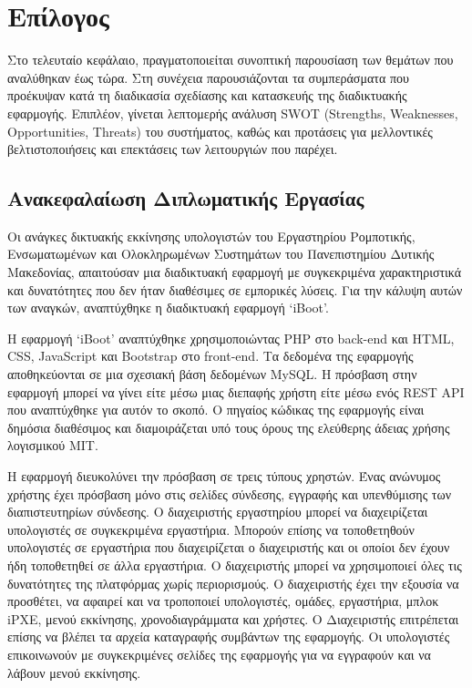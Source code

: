 \chapter{Επίλογος}
Στο τελευταίο κεφάλαιο, πραγματοποιείται συνοπτική παρουσίαση των θεμάτων που αναλύθηκαν έως τώρα. Στη συνέχεια παρουσιάζονται τα συμπεράσματα που προέκυψαν κατά τη διαδικασία σχεδίασης και κατασκευής της διαδικτυακής εφαρμογής.
Επιπλέον, γίνεται λεπτομερής ανάλυση SWOT (Strengths, Weaknesses, Opportunities, Threats) του συστήματος, καθώς και προτάσεις για μελλοντικές βελτιστοποιήσεις και επεκτάσεις των λειτουργιών που παρέχει.

\section{Ανακεφαλαίωση Διπλωματικής Εργασίας}
Οι ανάγκες δικτυακής εκκίνησης υπολογιστών του Εργαστηρίου Ρομποτικής, Ενσωματωμένων και Ολοκληρωμένων Συστημάτων του Πανεπιστημίου Δυτικής Μακεδονίας, απαιτούσαν μια διαδικτυακή εφαρμογή με συγκεκριμένα χαρακτηριστικά και δυνατότητες που δεν ήταν διαθέσιμες σε εμπορικές λύσεις. Για την κάλυψη αυτών των αναγκών, αναπτύχθηκε η διαδικτυακή εφαρμογή `iBoot'.

Η εφαρμογή `iBoot' αναπτύχθηκε χρησιμοποιώντας PHP στο back-end και HTML, CSS, JavaScript και Bootstrap στο front-end. Τα δεδομένα της εφαρμογής αποθηκεύονται σε μια σχεσιακή βάση δεδομένων MySQL. Η πρόσβαση στην εφαρμογή μπορεί να γίνει είτε μέσω μιας διεπαφής χρήστη είτε μέσω ενός REST API που αναπτύχθηκε για αυτόν το σκοπό. Ο πηγαίος κώδικας της εφαρμογής είναι δημόσια διαθέσιμος και διαμοιράζεται υπό τους όρους της ελεύθερης άδειας χρήσης λογισμικού MIT.

Η εφαρμογή διευκολύνει την πρόσβαση σε τρεις τύπους χρηστών.
Ένας ανώνυμος χρήστης έχει πρόσβαση μόνο στις σελίδες σύνδεσης, εγγραφής και υπενθύμισης των διαπιστευτηρίων σύνδεσης.
Ο διαχειριστής εργαστηρίου μπορεί να διαχειρίζεται υπολογιστές σε συγκεκριμένα εργαστήρια. Μπορούν επίσης να τοποθετηθούν υπολογιστές σε εργαστήρια που διαχειρίζεται ο διαχειριστής και οι οποίοι δεν έχουν ήδη τοποθετηθεί σε άλλα εργαστήρια.
Ο διαχειριστής μπορεί να χρησιμοποιεί όλες τις δυνατότητες της πλατφόρμας χωρίς περιορισμούς. Ο διαχειριστής έχει την εξουσία να προσθέτει, να αφαιρεί και να τροποποιεί υπολογιστές, ομάδες, εργαστήρια, μπλοκ iPXE, μενού εκκίνησης, χρονοδιαγράμματα και χρήστες. Ο Διαχειριστής επιτρέπεται επίσης να βλέπει τα αρχεία καταγραφής συμβάντων της εφαρμογής.
Οι υπολογιστές επικοινωνούν με συγκεκριμένες σελίδες της εφαρμογής για να εγγραφούν και να λάβουν μενού εκκίνησης.

